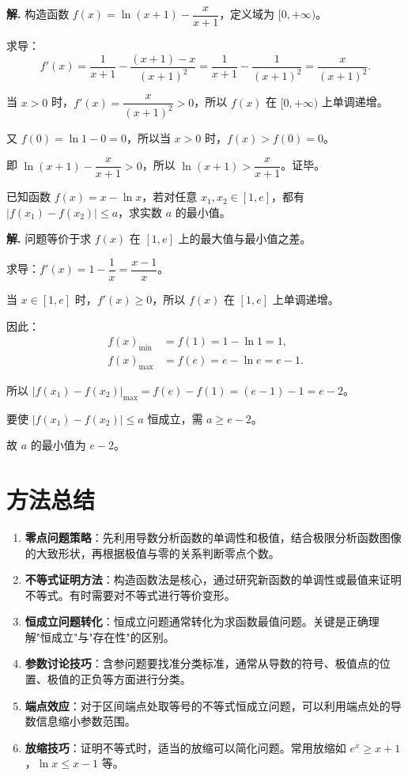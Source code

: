 \documentclass[11pt]{ctexrep}
\begin{document}
\textbf{解.} 构造函数 $f(x) = \ln(x + 1) - \dfrac{x}{x + 1}$，定义域为 $[0, +\infty)$。

求导：
\[
    f'(x) = \frac{1}{x + 1} - \frac{(x + 1) - x}{(x + 1)^2} = \frac{1}{x + 1} - \frac{1}{(x + 1)^2} = \frac{x}{(x + 1)^2}.
\]

当 $x > 0$ 时，$f'(x) = \dfrac{x}{(x + 1)^2} > 0$，所以 $f(x)$ 在 $[0, +\infty)$ 上单调递增。

又 $f(0) = \ln 1 - 0 = 0$，所以当 $x > 0$ 时，$f(x) > f(0) = 0$。

即 $\ln(x + 1) - \dfrac{x}{x + 1} > 0$，所以 $\ln(x + 1) > \dfrac{x}{x + 1}$。证毕。

\begin{example}[双变量问题]
    已知函数 $f(x) = x - \ln x$，若对任意 $x_1, x_2 \in [1, e]$，都有 $|f(x_1) - f(x_2)| \le a$，求实数 $a$ 的最小值。
\end{example}

\textbf{解.} 问题等价于求 $f(x)$ 在 $[1, e]$ 上的最大值与最小值之差。

求导：$f'(x) = 1 - \dfrac{1}{x} = \dfrac{x - 1}{x}$。

当 $x \in [1, e]$ 时，$f'(x) \ge 0$，所以 $f(x)$ 在 $[1, e]$ 上单调递增。

因此：
\begin{align*}
    f(x)_{\min} &= f(1) = 1 - \ln 1 = 1, \\[4pt]
    f(x)_{\max} &= f(e) = e - \ln e = e - 1.
\end{align*}

所以 $|f(x_1) - f(x_2)|_{\max} = f(e) - f(1) = (e - 1) - 1 = e - 2$。

要使 $|f(x_1) - f(x_2)| \le a$ 恒成立，需 $a \ge e - 2$。

故 $a$ 的最小值为 $e - 2$。

\section*{方法总结}

\begin{enumerate}
    \item \textbf{零点问题策略}：先利用导数分析函数的单调性和极值，结合极限分析函数图像的大致形状，再根据极值与零的关系判断零点个数。
    \item \textbf{不等式证明方法}：构造函数法是核心，通过研究新函数的单调性或最值来证明不等式。有时需要对不等式进行等价变形。
    \item \textbf{恒成立问题转化}：恒成立问题通常转化为求函数最值问题。关键是正确理解"恒成立"与"存在性"的区别。
    \item \textbf{参数讨论技巧}：含参问题要找准分类标准，通常从导数的符号、极值点的位置、极值的正负等方面进行分类。
    \item \textbf{端点效应}：对于区间端点处取等号的不等式恒成立问题，可以利用端点处的导数信息缩小参数范围。
    \item \textbf{放缩技巧}：证明不等式时，适当的放缩可以简化问题。常用放缩如 $e^x \ge x + 1$，$\ln x \le x - 1$ 等。
\end{enumerate}
\end{document}
